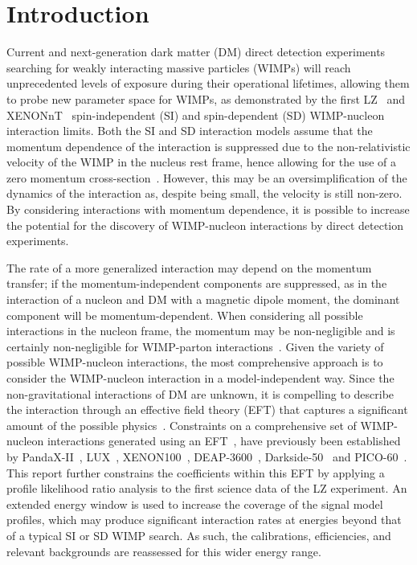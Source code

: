 \documentclass[reprint, showpacs,
preprintnumbers,
amsmath,amssymb,
aps, floatfix,
superscriptaddress,
prd, nofootinbib]{revtex4-1}
\begin{document}
\section{\label{sec:introduction}Introduction}
Current and next-generation dark matter (DM) direct detection experiments searching for weakly interacting massive particles (WIMPs) will reach unprecedented levels of exposure during their operational lifetimes, allowing them to probe new parameter space for WIMPs, as demonstrated by the first LZ~\cite{LZ:SR1WS_2022} and XENONnT~\cite{XenonNT:WS_2023} spin-independent (SI) and spin-dependent (SD) WIMP-nucleon interaction limits. 
Both the SI and SD interaction models assume that the momentum dependence of the interaction is suppressed due to the non-relativistic velocity of the WIMP in the nucleus rest frame, hence allowing for the use of a zero momentum cross-section~\cite{JUNGMAN:Supersymmetric_dark_matter}. 
However, this may be an oversimplification of the dynamics of the interaction as, despite being small, the velocity is still non-zero.
By considering interactions with momentum dependence, it is possible to increase the potential for the discovery of WIMP-nucleon interactions by direct detection experiments.
\par
The rate of a more generalized interaction may depend on the momentum transfer; if the momentum-independent components are suppressed, as in the interaction of a nucleon and DM with a magnetic dipole moment, the dominant component will be momentum-dependent.
When considering all possible interactions in the nucleon frame, the momentum may be non-negligible and is certainly non-negligible for WIMP-parton interactions~\cite{Hisano:2017jmz}.
Given the variety of possible WIMP-nucleon interactions, the most comprehensive approach is to consider the WIMP-nucleon interaction in a model-independent way. 
Since the non-gravitational interactions of DM are unknown, it is compelling to describe the interaction through an effective field theory (EFT) that captures a significant amount of the possible physics~\cite{georgi:EFT}.
Constraints on a comprehensive set of WIMP-nucleon interactions generated using an EFT~\cite{Fan_2010, Fitzpatrick:EFT}, have previously been established by PandaX-II~\cite{PandaX2:SD_EFT_2019}, LUX~\cite{LUX:EFTR4_2021}, XENON100~\cite{Xenon100:EFT_2017}, DEAP-3600~\cite{DEAP:eft_2020}, Darkside-50~\cite{DarkSide-50:eft_2020} and PICO-60~\cite{PICO:photonM_2022}.
This report further constrains the coefficients within this EFT by applying a profile likelihood ratio analysis to the first science data of the LZ experiment.
An extended energy window is used to increase the coverage of the signal model profiles, which may produce significant interaction rates at energies beyond that of a typical SI or SD WIMP search. 
As such, the calibrations, efficiencies, and relevant backgrounds are reassessed for this wider energy range.
\end{document}
